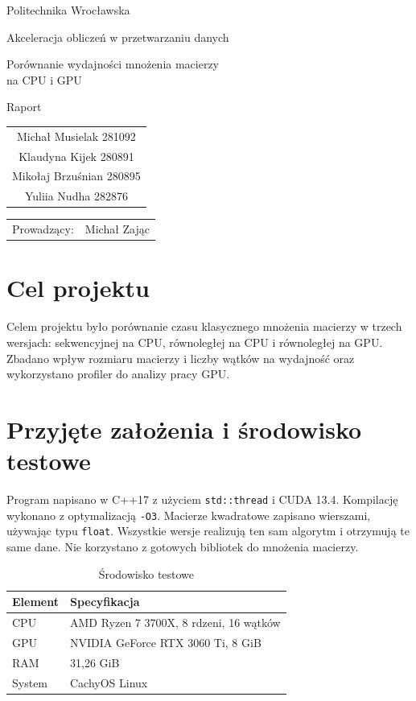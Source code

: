 \documentclass[12pt,a4paper]{article}
\begin{document}
\hypersetup{pageanchor=false}
\begin{titlepage}
\centering
{\Large Politechnika Wrocławska\par}
\vspace{12mm}
{\large Akceleracja obliczeń w przetwarzaniu danych\par}
\vspace{20mm}
{\LARGE Porównanie wydajności mnożenia macierzy\\[3mm]
na CPU i GPU\par}
\vspace{8mm}
{\large Raport\par}
\vspace{18mm}
\begin{tabular}{c}
Michał Musielak 281092\\[3mm]
Klaudyna Kijek 280891\\[3mm]
Mikołaj Brzuśnian 280895\\[3mm]
Yuliia Nudha 282876
\end{tabular}
\vfill
\begin{tabular}{rl}
Prowadzący: & Michał Zając
\end{tabular}
\vspace{12mm}
\end{titlepage}
\hypersetup{pageanchor=true}

\tableofcontents
\clearpage
\raggedbottom

\section{Cel projektu}

Celem projektu było porównanie czasu klasycznego mnożenia macierzy
w trzech wersjach: sekwencyjnej na CPU, równoległej na CPU i równoległej
na GPU. Zbadano wpływ rozmiaru macierzy i liczby wątków na wydajność
oraz wykorzystano profiler do analizy pracy GPU.

\section{Przyjęte założenia i środowisko testowe}

Program napisano w C++17 z użyciem \texttt{std::thread} i CUDA 13.4.
Kompilację wykonano z optymalizacją \texttt{-O3}.
Macierze kwadratowe zapisano wierszami, używając typu \texttt{float}.
Wszystkie wersje realizują ten sam algorytm i otrzymują te same dane.
Nie korzystano z gotowych bibliotek do mnożenia macierzy.

\begin{table}[H]
\caption{Środowisko testowe}
\label{tab:sprzet}
\centering
\begin{tabularx}{\textwidth}{@{}lX@{}}
\toprule
Element & Specyfikacja\\
\midrule
CPU & AMD Ryzen 7 3700X, 8 rdzeni, 16 wątków\\
GPU & NVIDIA GeForce RTX 3060 Ti, 8 GiB\\
RAM & 31,26 GiB\\
System & CachyOS Linux\\
\bottomrule
\end{tabularx}
\end{table}
\end{document}
